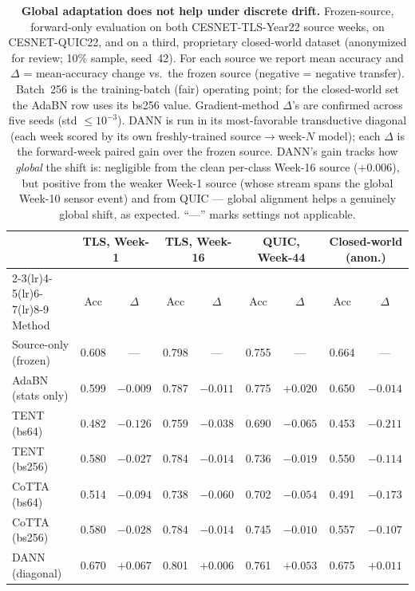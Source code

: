\begin{table}[t]
\caption{\textbf{Global adaptation does not help under discrete drift.}
Frozen-source, forward-only evaluation on both CESNET-TLS-Year22 source weeks, on
CESNET-QUIC22, and on a third, proprietary closed-world dataset (anonymized for
review; 10\% sample, seed~42). For each source we report mean accuracy and
$\Delta$ = mean-accuracy change vs.\ the frozen source (negative = negative
transfer). Batch~256 is the training-batch (fair) operating point; for the
closed-world set the AdaBN row uses its bs256 value. Gradient-method $\Delta$'s are
confirmed across five seeds (std $\le10^{-3}$). DANN is run in its most-favorable
transductive diagonal (each week scored by its own freshly-trained
source$\to$week-$N$ model); each $\Delta$ is the forward-week paired gain over the
frozen source. DANN's gain tracks how \emph{global} the shift is: negligible from
the clean per-class Week-16 source ($+0.006$), but positive from the weaker Week-1
source (whose stream spans the global Week-10 sensor event) and from QUIC --- global
alignment helps a genuinely global shift, as expected. ``---'' marks settings not
applicable.}
\label{tab:nt_merged}
\centering\small\setlength{\tabcolsep}{4.5pt}
\begin{tabular}{l cc cc cc cc}
\toprule
 & \multicolumn{2}{c}{TLS, Week-1} & \multicolumn{2}{c}{TLS, Week-16} & \multicolumn{2}{c}{QUIC, Week-44} & \multicolumn{2}{c}{Closed-world (anon.)} \\
\cmidrule(lr){2-3}\cmidrule(lr){4-5}\cmidrule(lr){6-7}\cmidrule(lr){8-9}
Method & Acc & $\Delta$ & Acc & $\Delta$ & Acc & $\Delta$ & Acc & $\Delta$ \\
\midrule
Source-only (frozen) & 0.608 & --- & 0.798 & --- & 0.755 & --- & 0.664 & --- \\
AdaBN~\cite{li2016adabn} (stats only) & 0.599 & $-0.009$ & 0.787 & $-0.011$ & 0.775 & $+0.020$ & 0.650 & $-0.014$ \\
TENT~\cite{wang2020tent} (bs64) & 0.482 & $-0.126$ & 0.759 & $-0.038$ & 0.690 & $-0.065$ & 0.453 & $-0.211$ \\
TENT~\cite{wang2020tent} (bs256) & 0.580 & $-0.027$ & 0.784 & $-0.014$ & 0.736 & $-0.019$ & 0.550 & $-0.114$ \\
CoTTA~\cite{wang2022cotta} (bs64) & 0.514 & $-0.094$ & 0.738 & $-0.060$ & 0.702 & $-0.054$ & 0.491 & $-0.173$ \\
CoTTA~\cite{wang2022cotta} (bs256) & 0.580 & $-0.028$ & 0.784 & $-0.014$ & 0.745 & $-0.010$ & 0.557 & $-0.107$ \\
DANN~\cite{ganin2016dann} (diagonal) & 0.670 & $+0.067$ & 0.801 & $+0.006$ & 0.761 & $+0.053$ & 0.675 & $+0.011$ \\
\bottomrule
\end{tabular}
\end{table}

